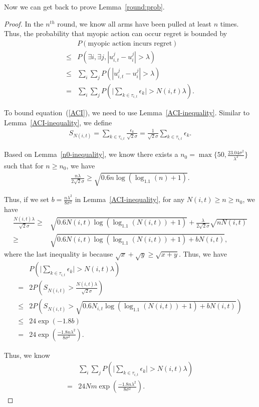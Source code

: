 \documentclass{article}
\begin{document}
Now we can get back to prove Lemma~\ref{round:prob}.

\begin{proof}
In the $n^{th}$ round, we know all arms have been pulled at least $n$ times. Thus, the probability that myopic action can occur regret is bounded by
\begin{align}
&P(\text{myopic action incurs regret})\nonumber \\
\leq &P(\exists i, \exists j, |u_{i,t}^{j}-u_{i}^{j}|>\lambda) \nonumber \\
\leq & \sum_{i}\sum_{j} P(|u_{i,t}^{j}-u_{i}^{j}|>\lambda) \nonumber \\
= &  \sum_{i}\sum_{j} P\left(\bigg|\sum_{k\in \tau_{i,t}}\epsilon_{k}\bigg|>N(i,t)\lambda\right). \label{ACI}
\end{align}

To bound equation~(\ref{ACI}), we need to use Lemma~\ref{ACI-inequality}. Similar to Lemma~\ref{ACI-inequality}, we define
\begin{align}
S_{N(i,t)}=\sum_{k\in\tau_{i,t}}\frac{\epsilon_{k}}{\sqrt{2}\sigma}=\frac{1}{\sqrt{2}\sigma}\sum_{k\in\tau_{i,t}}\epsilon_{k}. \nonumber
\end{align}

Based on Lemma~\ref{n0-inequality}, we know there exists a $n_{0}=\max\{50, \frac{23.04\sigma^2}{\lambda^2}\}$ such that for $n\geq n_{0}$, we have
\begin{align}
\frac{n\lambda}{2\sqrt{2}\sigma}\geq \sqrt{0.6n\log(\log_{1.1}(n)+1)}. \nonumber
\end{align}

Thus, if we set $b=\frac{n\lambda^2}{8\sigma^2}$ in Lemma~\ref{ACI-inequality}, for any $N(i,t)\geq n\geq n_{0}$, we have
\begin{align}
\frac{N(i,t)\lambda}{\sqrt{2}\sigma}\geq & \sqrt{0.6N(i,t)\log(\log_{1.1}(N(i,t))+1)}+\frac{\lambda}{2\sqrt{2}\sigma}\sqrt{n N(i,t)} \nonumber \\
\geq & \sqrt{0.6N(i,t)\log(\log_{1.1}(N(i,t))+1)+bN(i,t)}, \nonumber 
\end{align}
where the last inequality is because $\sqrt{x}+\sqrt{y}\geq \sqrt{x+y}$. Thus, we have
\begin{align}
&P\left(\bigg|\sum_{k\in \tau_{i,t}}\epsilon_{k}\bigg|>N(i,t)\lambda\right) \nonumber \\
=&2P\left(S_{N(i,t)}>\frac{N(i,t)\lambda}{\sqrt{2}\sigma}\right) \nonumber \\
\leq & 2P\left(S_{N(i,t)}> \sqrt{0.6 N_{i,t}\log(\log_{1.1}(N(i,t))+1)+b N(i,t)}\right) \nonumber \\
\leq & 24\exp( -1.8b) \nonumber \\
= & 24\exp\left(\frac{-1.8 n\lambda^2}{8\sigma^2}\right). \nonumber
\end{align}


Thus, we know
\begin{align}
&\sum_{i}\sum_{j} P\left(\bigg|\sum_{k\in \tau_{i,t}}\epsilon_{k}\bigg|>N(i,t)\lambda\right)  \nonumber \\
=& 24Nm \exp\left(\frac{-1.8 n\lambda^2}{8\sigma^2}\right). \nonumber
\end{align}

\end{proof}
\end{document}
